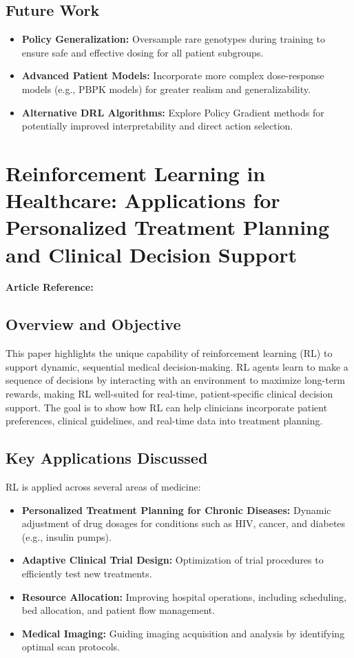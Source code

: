 \subsection*{Future Work}
\begin{itemize}
    \item \textbf{Policy Generalization:} Oversample rare genotypes during training to ensure safe and effective dosing for all patient subgroups.
    \item \textbf{Advanced Patient Models:} Incorporate more complex dose-response models (e.g., PBPK models) for greater realism and generalizability.
    \item \textbf{Alternative DRL Algorithms:} Explore Policy Gradient methods for potentially improved interpretability and direct action selection.
\end{itemize}

\section{Reinforcement Learning in Healthcare: Applications for Personalized Treatment Planning and Clinical Decision Support}
\textbf{Article Reference:} \cite{deshmukhReinforcementLearningHealthcare2024}

\subsection*{Overview and Objective}
This paper highlights the unique capability of reinforcement learning (RL) to support dynamic, sequential medical decision-making. RL agents learn to make a sequence of decisions by interacting with an environment to maximize long-term rewards, making RL well-suited for real-time, patient-specific clinical decision support. The goal is to show how RL can help clinicians incorporate patient preferences, clinical guidelines, and real-time data into treatment planning.

\subsection*{Key Applications Discussed}
RL is applied across several areas of medicine:
\begin{itemize}
    \item \textbf{Personalized Treatment Planning for Chronic Diseases:} Dynamic adjustment of drug dosages for conditions such as HIV, cancer, and diabetes (e.g., insulin pumps).
    \item \textbf{Adaptive Clinical Trial Design:} Optimization of trial procedures to efficiently test new treatments.
    \item \textbf{Resource Allocation:} Improving hospital operations, including scheduling, bed allocation, and patient flow management.
    \item \textbf{Medical Imaging:} Guiding imaging acquisition and analysis by identifying optimal scan protocols.
\end{itemize}


